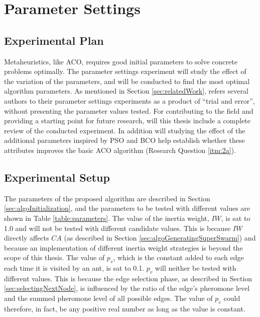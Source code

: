 \section{Parameter Settings}
\label{sec:parametersettings}

\subsection{Experimental Plan}
Metaheuristics, like ACO, requires good initial parameters to solve concrete problems optimally. The parameter settings experiment will study the effect of the variation of the parameters, and will be conducted to find the most optimal algorithm parameters. As mentioned in Section \vref{sec:relatedWork}, refers several authors to their parameter settings experiments as a product of ``trial and error'', without presenting the parameter values tested. For contributing to the field and providing a starting point for future research, will this thesis include a complete review of the conducted experiment. %
In addition will studying the effect of the additional parameters inspired by PSO and BCO help establish whether these attributes improves the basic ACO algorithm (Research Question \vref{itm:2a}).

\subsection{Experimental Setup}
\label{subsec:parameterSettings_setup}
The parameters of the proposed algorithm are described in Section \vref{sec:algoInitialization}, and the parameters 
to be tested with different values are shown in Table \ref{table:parameters}. The value of the inertia weight, $IW$, is sat to 1.0 and will not be tested with different candidate values. This is because $IW$ directly affects $CA$ (as described in Section \vref{sec:algoGeneratingSuperSwarm}) and because an implementation of different inertia weight strategies is beyond the scope of this thesis. The value of $p_v$, which is the constant added to each edge each time it is visited by an ant, is sat to 0.1. $p_v$ will neither be tested with different values. This is because the edge selection phase, as described in Section \vref{sec:selectingNextNode}, is influenced by the ratio of the edge's pheromone level and the summed pheromone level of all possible edges. The value of $p_v$ could therefore, in fact, be any positive real number as long as the value is constant.

